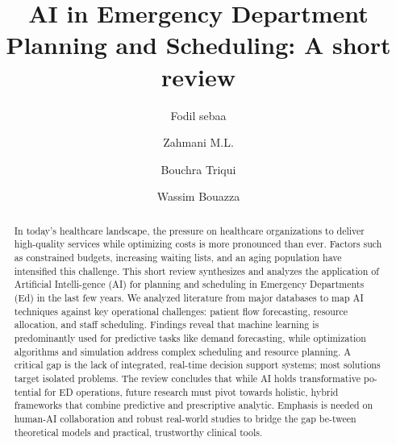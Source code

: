 \documentclass[runningheads]{llncs}
\begin{document}
\title{AI in Emergency Department Planning and Scheduling: A short review}
\author{Fodil sebaa \and Zahmani M.L. \and Bouchra Triqui \and Wassim Bouazza}

\maketitle

\begin{abstract}
In today's healthcare landscape, the pressure on healthcare organizations to deliver high-quality services while optimizing costs is more pronounced than ever. Factors such as constrained budgets, increasing waiting lists, and an
aging population have intensified this challenge.
This short review synthesizes and analyzes the application of Artificial Intelli-gence (AI) for planning and scheduling in Emergency Departments (Ed) in the last few years. We analyzed literature from major databases to map AI techniques against key operational challenges: patient flow forecasting, resource allocation, and staff scheduling. Findings reveal that machine learning is predominantly used for predictive tasks like demand forecasting, while optimization algorithms and simulation address complex scheduling and resource planning. A critical gap is the lack of integrated, real-time decision support systems; most solutions target isolated problems. The review concludes that while AI holds transformative po-tential for ED operations, future research must pivot towards holistic, hybrid frameworks that combine predictive and prescriptive analytic. Emphasis is needed on human-AI collaboration and robust real-world studies to bridge the gap be-tween theoretical models and practical, trustworthy clinical tools.
\end{abstract}
\end{document}
